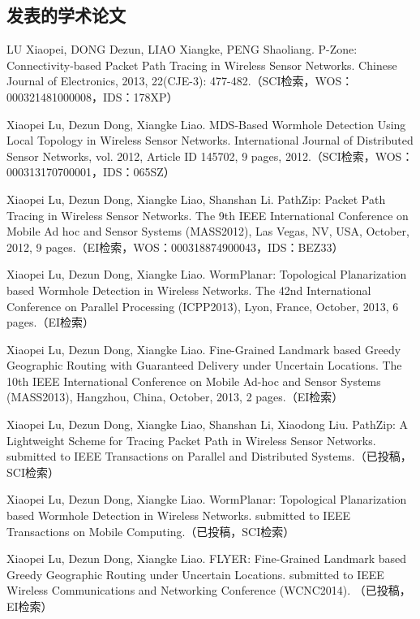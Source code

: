 \begin{resume}

  \section*{发表的学术论文} %

  \begin{enumerate}[{[}1{]}]
  \addtolength{\itemsep}{-.36\baselineskip}%
  \item LU Xiaopei, DONG Dezun, LIAO Xiangke, PENG Shaoliang. P-Zone: Connectivity-based Packet Path Tracing in Wireless Sensor Networks. Chinese Journal of Electronics, 2013, 22(CJE-3): 477-482.（SCI检索，WOS：000321481000008，IDS：178XP）
  \item Xiaopei Lu, Dezun Dong, Xiangke Liao. MDS-Based Wormhole Detection Using Local Topology in Wireless Sensor Networks. International Journal of Distributed Sensor Networks, vol. 2012, Article ID 145702, 9 pages, 2012.（SCI检索，WOS：000313170700001，IDS：065SZ）
  \item Xiaopei Lu, Dezun Dong, Xiangke Liao, Shanshan Li. PathZip: Packet Path Tracing in Wireless Sensor Networks. The 9th IEEE International Conference on Mobile Ad hoc and Sensor Systems (MASS2012), Las Vegas, NV, USA, October, 2012, 9 pages.（EI检索，WOS：000318874900043，IDS：BEZ33）
  \item Xiaopei Lu, Dezun Dong, Xiangke Liao. WormPlanar: Topological Planarization based Wormhole Detection in Wireless Networks. The 42nd International Conference on Parallel Processing (ICPP2013), Lyon, France, October, 2013, 6 pages.（EI检索）
  \item Xiaopei Lu, Dezun Dong, Xiangke Liao. Fine-Grained Landmark based Greedy Geographic Routing with Guaranteed Delivery under Uncertain Locations. The 10th IEEE International Conference on Mobile Ad-hoc and Sensor Systems (MASS2013), Hangzhou, China, October, 2013, 2 pages.（EI检索）
  \item Xiaopei Lu, Dezun Dong, Xiangke Liao, Shanshan Li, Xiaodong Liu. PathZip: A Lightweight Scheme for Tracing Packet Path in Wireless Sensor Networks. submitted to IEEE Transactions on Parallel and Distributed Systems.（已投稿，SCI检索）
  \item Xiaopei Lu, Dezun Dong, Xiangke Liao. WormPlanar: Topological Planarization based Wormhole Detection in Wireless Networks. submitted to IEEE Transactions on Mobile Computing.（已投稿，SCI检索）
  \item Xiaopei Lu, Dezun Dong, Xiangke Liao. FLYER: Fine-Grained Landmark based Greedy Geographic Routing under Uncertain Locations. submitted to IEEE Wireless Communications and Networking Conference (WCNC2014). （已投稿，EI检索）

\end{enumerate}
\end{resume}
